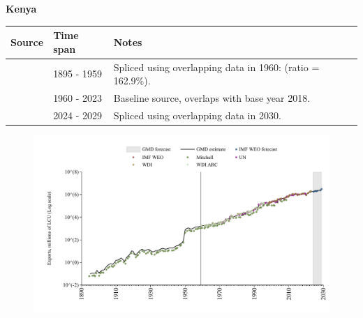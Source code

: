 \documentclass[12pt,a4paper,landscape]{article}
\begin{document}
\begin{adjustbox}{max totalsize={\paperwidth}{\paperheight},center}
\begin{minipage}[t][\textheight][t]{\textwidth}
\vspace*{0.5cm}
{}
\begin{center}
{\Large\bfseries Kenya}
\end{center}
\vspace{0.5cm}
\begin{table}[H]
\centering
\small
\begin{tabular}{|l|l|l|}
\hline
\textbf{Source} & \textbf{Time span} & \textbf{Notes} \\
\hline
\rowcolor{white}\cite{Mitchell}& 1895 - 1959 &Spliced using overlapping data in 1960: (ratio = 162.9\%).\\
\rowcolor{lightgray}\cite{WDI}& 1960 - 2023 &Baseline source, overlaps with base year 2018.\\
\rowcolor{white}\cite{IMF_WEO_forecast}& 2024 - 2029 &Spliced using overlapping data in 2030.\\
\hline
\end{tabular}
\end{table}
\begin{figure}[H]
\centering
\includegraphics[width=\textwidth,height=0.6\textheight,keepaspectratio]{graphs/KEN_exports.pdf}
\end{figure}
\end{minipage}
\end{adjustbox}
\end{document}
